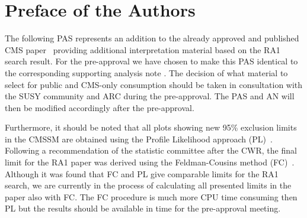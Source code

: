 \section{Preface of the Authors}

The following PAS represents an addition to the already approved and
published CMS paper~\cite{RA1Paper} providing additional
interpretation material based on the RA1 search result. For the
pre-approval we have chosen to make this PAS identical to the
corresponding supporting analysis note \cite{AN-11-043}.
The decision of what material to select for public and CMS-only
consumption should be taken in consultation with the SUSY community
and ARC during the pre-approval. The PAS and AN will then be modified
accordingly after the pre-approval.

Furthermore, it should be noted that all plots showing new 95\%
exclusion limits in the CMSSM are obtained using the Profile
Likelihood approach (PL)~\cite{ProfileLikelihood}. Following a
recommendation of the statistic committee after the CWR, the final
limit for the RA1 paper was derived using the Feldman-Cousins method
(FC)~\cite{refFC}. Although it was found that FC and PL give
comparable limits for the RA1 search, we are currently in the process
of calculating all presented limits in the paper also with FC. The FC
procedure is much more CPU time consuming then PL but the results
should be available in time for the pre-approval meeting.
